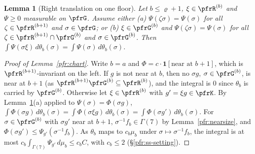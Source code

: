 \documentclass[10pt]{amsart}
\newtheorem{lemma}[theorem]{Lemma}
\theoremstyle{definition}
\theoremstyle{remark}
\begin{document}
\begin{lemma}[Right translation on one floor]\label{pfr:floorright}
Let $b\le\varrho+1$, $\xi\in\pfrR^{(b)}$ and $\Psi\ge0$ measurable on $\pfrG$. Assume either
(a) $\Psi(\zeta\sigma)=\Psi(\sigma)$ for all $\zeta\in\pfrR^{(b+1)}$ and $\sigma\in\pfrG$; or
(b) $\xi\in\pfrG^{(b)}$ and $\Psi(\zeta\sigma)=\Psi(\sigma)$ for all $\zeta\in\pfrR^{(b+1)}\cap\pfrG^{(b)}$ and
$\sigma\in\pfrG^{(b)}$.
Then $\int\Psi(\sigma\xi)\,d\theta_b(\sigma)=\int\Psi(\sigma)\,d\theta_b(\sigma)$.
\end{lemma}
\begin{proof}[Proof of Lemma~\ref{pfr:chart}]
Write $b=a$ and $\Phi=c\cdot\mathbf 1[\text{near at }b+1]$, which is $\pfrR^{(b+1)}$-invariant on the left. If
$g$ is not near at $b$, then no $\sigma g$, $\sigma\in\pfrG^{(b)}$, is near at $b+1$ (as
$\pfrR^{(b+1)}\pfrG^{(b)}\subseteq\pfrR^{(b)}$), and the integral is $0$ since $\theta_b$ is carried by $\pfrG^{(b)}$.
Otherwise let $\xi\in\pfrR^{(b)}$ with $g'=\xi g\in\pfrK$. By Lemma~\ref{pfr:floorright}(a) applied to
$\Psi(\sigma)=\Phi(\sigma g)$, $\int\Phi(\sigma g)\,d\theta_b(\sigma)=\int\Phi(\sigma\xi g)\,d\theta_b(\sigma)=\int\Phi(\sigma g')\,d\theta_b(\sigma)$. For
$\sigma\in\pfrG^{(b)}$ with $\sigma g'$ near at $b+1$, $\sigma^{-1}f_b\in\Gamma(7)$ by Lemma~\ref{pfr:nearsize}, and
$\Phi(\sigma g')\le\Psi_{g'}(\sigma^{-1}f_b)$. As $\theta_b$ maps to $c_b\mu_b$ under $\sigma\mapsto\sigma^{-1}f_b$, the
integral is at most $c_b\int_{\Gamma(7)}\Psi_{g'}\,d\mu_b\le c_bC$, with $c_b\le2$ (\S\ref{pfr:ss-setting}).
\end{proof}
\end{document}
